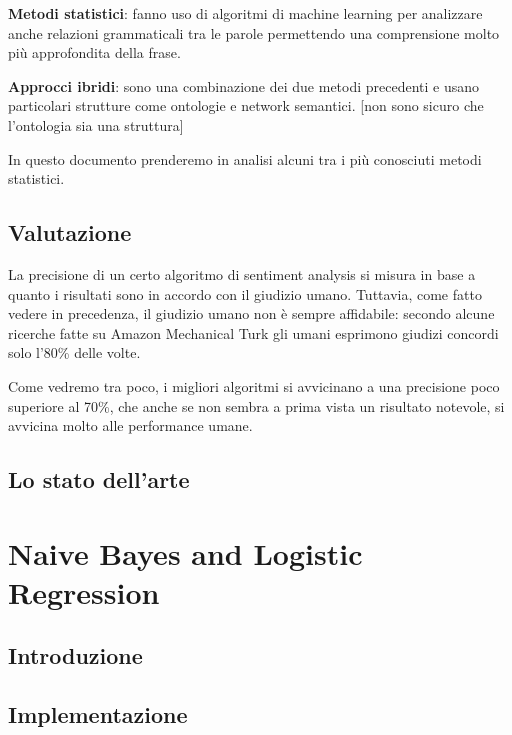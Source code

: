 \documentclass[Lau,binding=0.6cm]{sapthesis}
\begin{document}
\bigskip

\textbf{Metodi statistici}: fanno uso di algoritmi di machine learning per analizzare 
anche relazioni grammaticali tra le parole permettendo una comprensione molto più 
approfondita della frase.

\bigskip

\textbf{Approcci ibridi}: sono una combinazione dei due metodi precedenti e usano 
particolari strutture come ontologie e network semantici. [non sono sicuro che l'ontologia sia una struttura]

In questo documento prenderemo in analisi alcuni tra i più conosciuti metodi statistici.

\section{Valutazione}


La precisione di un certo algoritmo di sentiment analysis si misura in base
a quanto i risultati sono in accordo con il giudizio umano. 
Tuttavia, come fatto vedere in precedenza, il giudizio umano non è sempre affidabile:
secondo alcune ricerche fatte su Amazon Mechanical Turk
\cite{amazon}
gli umani esprimono giudizi concordi solo l'80\% delle volte. 

Come vedremo tra poco, i migliori algoritmi si avvicinano a una precisione poco
superiore al 70\%, che anche se non sembra a prima vista un risultato notevole,
si avvicina molto alle performance umane.

\section{Lo stato dell'arte}

\begin{itemize}

\cite{nbsvm}

\end{itemize}


\chapter{Naive Bayes and Logistic Regression}

\section{Introduzione}
\section{Implementazione}
\end{document}
